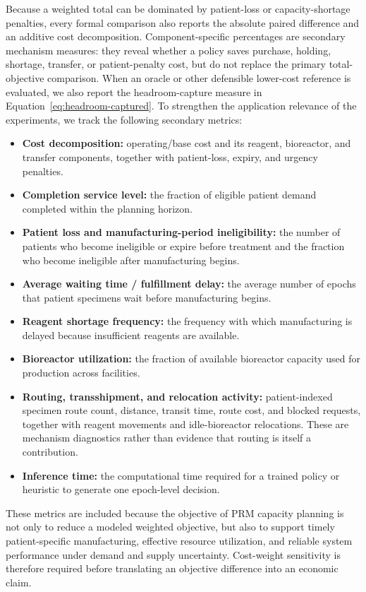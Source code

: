 \documentclass[preprint,review,12pt]{elsarticle}
\begin{document}
Because a weighted total can be dominated by patient-loss or capacity-shortage
penalties, every formal comparison also reports the absolute paired difference
and an additive cost decomposition. Component-specific percentages are
secondary mechanism measures: they reveal whether a policy saves purchase,
holding, shortage, transfer, or patient-penalty cost, but do not replace the
primary total-objective comparison. When an oracle or other defensible
lower-cost reference is evaluated, we also report the headroom-capture measure
in Equation~\eqref{eq:headroom-captured}. To strengthen the application
relevance of the experiments, we track the following secondary metrics:
\begin{itemize}
    \item \textbf{Cost decomposition:} operating/base cost and its reagent, bioreactor, and transfer components, together with patient-loss, expiry, and urgency penalties.
    \item \textbf{Completion service level:} the fraction of eligible patient demand completed within the planning horizon.
    \item \textbf{Patient loss and manufacturing-period ineligibility:} the number of patients who become ineligible or expire before treatment and the fraction who become ineligible after manufacturing begins.
    \item \textbf{Average waiting time / fulfillment delay:} the average number of epochs that patient specimens wait before manufacturing begins.
    \item \textbf{Reagent shortage frequency:} the frequency with which manufacturing is delayed because insufficient reagents are available.
    \item \textbf{Bioreactor utilization:} the fraction of available bioreactor capacity used for production across facilities.
    \item \textbf{Routing, transshipment, and relocation activity:} patient-indexed specimen route count, distance, transit time, route cost, and blocked requests, together with reagent movements and idle-bioreactor relocations. These are mechanism diagnostics rather than evidence that routing is itself a contribution.
    \item \textbf{Inference time:} the computational time required for a trained policy or heuristic to generate one epoch-level decision.
\end{itemize}

These metrics are included because the objective of PRM capacity planning is
not only to reduce a modeled weighted objective, but also to support timely
patient-specific manufacturing, effective resource utilization, and reliable
system performance under demand and supply uncertainty. Cost-weight
sensitivity is therefore required before translating an objective difference
into an economic claim.
\end{document}
